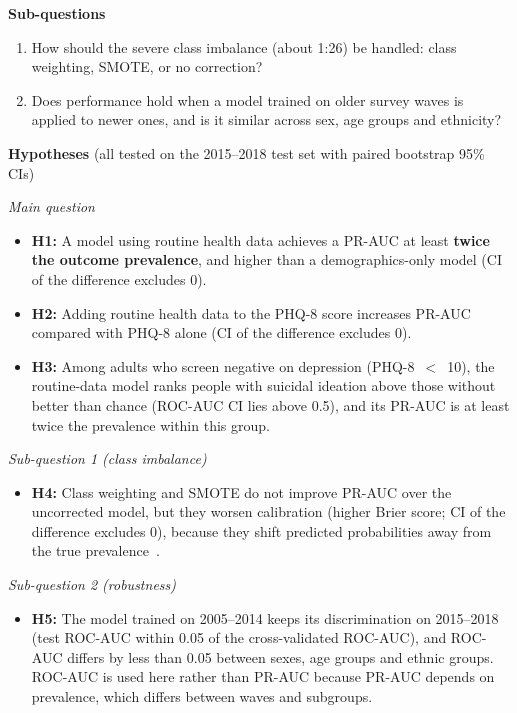 \documentclass[11pt,a4paper]{article}
\begin{document}
\textbf{Sub-questions}
\begin{enumerate}
  \item How should the severe class imbalance (about 1:26) be handled: class
        weighting, SMOTE, or no correction?
  \item Does performance hold when a model trained on older survey waves is applied to
        newer ones, and is it similar across sex, age groups and ethnicity?
\end{enumerate}

\textbf{Hypotheses} (all tested on the 2015--2018 test set with paired bootstrap 95\% CIs)

\textit{Main question}
\begin{itemize}
  \item \textbf{H1:} A model using routine health data achieves a PR-AUC at least
        \textbf{twice the outcome prevalence}, and higher than a demographics-only model
        (CI of the difference excludes 0).
  \item \textbf{H2:} Adding routine health data to the PHQ-8 score increases PR-AUC
        compared with PHQ-8 alone (CI of the difference excludes 0).
  \item \textbf{H3:} Among adults who screen negative on depression (PHQ-8~$<$~10), the
        routine-data model ranks people with suicidal ideation above those without
        better than chance (ROC-AUC CI lies above 0.5), and its PR-AUC is at least twice
        the prevalence within this group.
\end{itemize}

\textit{Sub-question 1 (class imbalance)}
\begin{itemize}
  \item \textbf{H4:} Class weighting and SMOTE do not improve PR-AUC over the
        uncorrected model, but they worsen calibration (higher Brier score; CI of the
        difference excludes 0), because they shift predicted probabilities away from
        the true prevalence~\cite{vandengoorbergh2022}.
\end{itemize}

\textit{Sub-question 2 (robustness)}
\begin{itemize}
  \item \textbf{H5:} The model trained on 2005--2014 keeps its discrimination on
        2015--2018 (test ROC-AUC within 0.05 of the cross-validated ROC-AUC), and
        ROC-AUC differs by less than 0.05 between sexes, age groups and ethnic groups.
        ROC-AUC is used here rather than PR-AUC because PR-AUC depends on prevalence,
        which differs between waves and subgroups.
\end{itemize}
\end{document}
